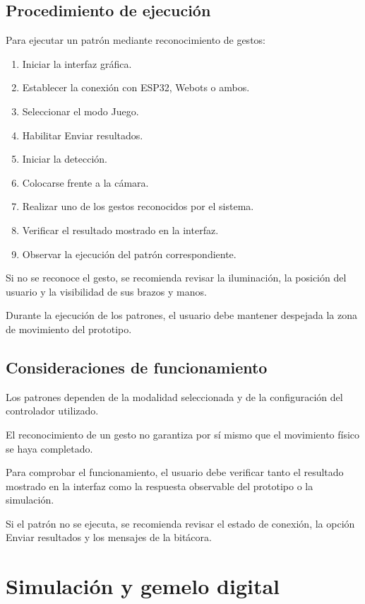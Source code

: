 \documentclass[letterpaper,journal]{IEEEtran}
\begin{document}
\subsection{Procedimiento de ejecución}

Para ejecutar un patrón mediante
reconocimiento de gestos:

\begin{enumerate}
    \item Iniciar la interfaz gráfica.
    \item Establecer la conexión con
    ESP32, Webots o ambos.
    \item Seleccionar el modo Juego.
    \item Habilitar Enviar resultados.
    \item Iniciar la detección.
    \item Colocarse frente a la cámara.
    \item Realizar uno de los gestos
    reconocidos por el sistema.
    \item Verificar el resultado
    mostrado en la interfaz.
    \item Observar la ejecución del
    patrón correspondiente.
\end{enumerate}

Si no se reconoce el gesto, se
recomienda revisar la iluminación,
la posición del usuario y la
visibilidad de sus brazos y manos.

Durante la ejecución de los patrones,
el usuario debe mantener despejada
la zona de movimiento del prototipo.

\subsection{Consideraciones de funcionamiento}

Los patrones dependen de la modalidad
seleccionada y de la configuración
del controlador utilizado.

El reconocimiento de un gesto no
garantiza por sí mismo que el
movimiento físico se haya completado.

Para comprobar el funcionamiento,
el usuario debe verificar tanto
el resultado mostrado en la interfaz
como la respuesta observable del
prototipo o la simulación.

Si el patrón no se ejecuta,
se recomienda revisar el estado
de conexión, la opción Enviar
resultados y los mensajes
de la bitácora.

\section{Simulación y gemelo digital}
\label{sec:simulacion}
\end{document}
